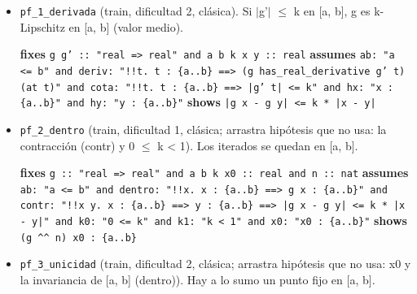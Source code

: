 \documentclass[11pt,a4paper]{article}
\begin{document}
\begin{itemize}
  \item \texttt{pf\_\allowbreak{}1\_\allowbreak{}derivada} (train, dificultad 2, clásica). Si $|$g'$|$ $\le $ k en [a, b], g es k-Lipschitz en [a, b] (valor medio).\\
  {\footnotesize \textbf{fixes} \texttt{g g' :\allowbreak{}:\allowbreak{} "real =\allowbreak{}> real" and a b k x y :\allowbreak{}:\allowbreak{} real} \textbf{assumes} \texttt{ab:\allowbreak{} "a <=\allowbreak{} b" and deriv:\allowbreak{} "!{}!t. t :\allowbreak{} \{a..b\} =\allowbreak{}=\allowbreak{}> (\allowbreak{}g has\_\allowbreak{}real\_\allowbreak{}derivative g' t) (\allowbreak{}at t)" and cota:\allowbreak{} "!{}!t. t :\allowbreak{} \{a..b\} =\allowbreak{}=\allowbreak{}> |\allowbreak{}g' t|\allowbreak{} <=\allowbreak{} k" and hx:\allowbreak{} "x :\allowbreak{} \{a..b\}" and hy:\allowbreak{} "y :\allowbreak{} \{a..b\}"} \textbf{shows} \texttt{|\allowbreak{}g x -\allowbreak{} g y|\allowbreak{} <=\allowbreak{} k *\allowbreak{} |\allowbreak{}x -\allowbreak{} y|\allowbreak{}}\par}
  \item \texttt{pf\_\allowbreak{}2\_\allowbreak{}dentro} (train, dificultad 1, clásica; arrastra hipótesis que no usa: la contracción (contr) y 0 $\le $ k < 1). Los iterados se quedan en [a, b].\\
  {\footnotesize \textbf{fixes} \texttt{g :\allowbreak{}:\allowbreak{} "real =\allowbreak{}> real" and a b k x0 :\allowbreak{}:\allowbreak{} real and n :\allowbreak{}:\allowbreak{} nat} \textbf{assumes} \texttt{ab:\allowbreak{} "a <=\allowbreak{} b" and dentro:\allowbreak{} "!{}!x. x :\allowbreak{} \{a..b\} =\allowbreak{}=\allowbreak{}> g x :\allowbreak{} \{a..b\}" and contr:\allowbreak{} "!{}!x y. x :\allowbreak{} \{a..b\} =\allowbreak{}=\allowbreak{}> y :\allowbreak{} \{a..b\} =\allowbreak{}=\allowbreak{}> |\allowbreak{}g x -\allowbreak{} g y|\allowbreak{} <=\allowbreak{} k *\allowbreak{} |\allowbreak{}x -\allowbreak{} y|\allowbreak{}" and k0:\allowbreak{} "0 <=\allowbreak{} k" and k1:\allowbreak{} "k < 1" and x0:\allowbreak{} "x0 :\allowbreak{} \{a..b\}"} \textbf{shows} \texttt{(\allowbreak{}g \textasciicircum{}\textasciicircum{} n) x0 :\allowbreak{} \{a..b\}}\par}
  \item \texttt{pf\_\allowbreak{}3\_\allowbreak{}unicidad} (train, dificultad 2, clásica; arrastra hipótesis que no usa: x0 y la invariancia de [a, b] (dentro)). Hay a lo sumo un punto fijo en [a, b].\\

\end{itemize}
\end{document}
